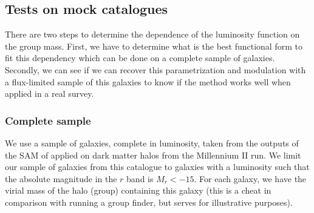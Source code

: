 \subsection{Tests on mock catalogues}

There are two steps to determine the dependence of the luminosity function on
the group mass. First, we have to determine what is the best functional form to
fit this dependency which can be done on a complete sample of galaxies.
Secondly, we can see if we can recover this parametrization and modulation with
a flux-limited sample of this galaxies to know if the method works well when
applied in a real survey.

\subsubsection{Complete sample}

We use a sample of galaxies, complete in luminosity, taken from the outputs of
the SAM of \citet{Guo+11} applied on dark matter halos from the Millennium II
run. We limit our sample of galaxies from this catalogue to galaxies with a
luminosity such that the absolute magnitude in the $r$ band is $M_r<-15$. For
each galaxy, we have the virial mass of the halo (group) containing this galaxy
(this is a cheat in comparison with running a group finder, but serves for
illustrative purposes).

